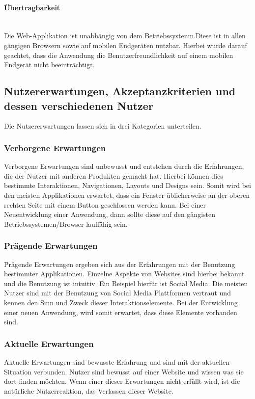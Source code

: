 \paragraph{Übertragbarkeit}\mbox{} \\
\noindent
Die Web-Applikation ist unabhängig von dem Betriebssystenm.Diese ist in allen gängigen Browsern sowie auf mobilen Endgeräten nutzbar. Hierbei wurde darauf geachtet, dass die Anwendung die Benutzerfreundlichkeit auf einem mobilen Endgerät nicht beeinträchtigt.


\newpage
\subsection{Nutzererwartungen, Akzeptanzkriterien und dessen verschiedenen Nutzer}
Die Nutzererwartungen lassen sich in drei Kategorien unterteilen.
\subsubsection{Verborgene Erwartungen}
Verborgene Erwartungen sind unbewusst und entstehen durch die Erfahrungen, die der Nutzer mit anderen Produkten gemacht hat. Hierbei können dies bestimmte Interaktionen, Navigationen, Layouts und Designs sein. Somit wird bei den meisten Applikationen erwartet, dass ein Fenster üblicherweise an der oberen rechten Seite mit einem Button geschlossen werden kann. Bei einer Neuentwicklung einer Anwendung, dann sollte diese auf den gängisten Betriebssystemen/Browser lauffähig sein. 
\subsubsection{Prägende Erwartungen}
Prägende Erwartungen ergeben sich aus der Erfahrungen mit der Benutzung bestimmter Applikationen. Einzelne Aspekte von Websites sind hierbei bekannt und die Benutzung ist intuitiv. Ein Beispiel hierfür ist Social Media. Die meisten Nutzer sind mit der Benutzung von Social Media Plattformen vertraut und kennen den Sinn und Zweck dieser Interaktionselemente. Bei der Entwicklung einer neuen Anwendung, wird somit erwartet, dass diese Elemente vorhanden sind.
\subsubsection{Aktuelle Erwartungen}
Aktuelle Erwartungen sind bewusste Erfahrung und sind mit der aktuellen Situation verbunden. Nutzer sind bewusst auf einer Website und wissen was sie dort finden möchten. Wenn einer dieser Erwartungen nicht erfüllt wird, ist die natürliche Nutzerreaktion, das Verlassen dieser Website. \autocite*{noauthor_user_nodate}

